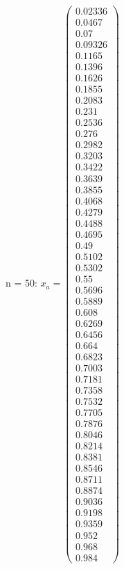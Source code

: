 \documentclass{udpreport}
\begin{document}
\begin{enumerate}
\begin{enumerate}
\begin{itemize}
\begin{itemize}
				n = 50: $x_{a} = \left(\begin{array}{c} 0.02336\\ 0.0467\\ 0.07\\ 0.09326\\ 0.1165\\ 0.1396\\ 0.1626\\ 0.1855\\ 0.2083\\ 0.231\\ 0.2536\\ 0.276\\ 0.2982\\ 0.3203\\ 0.3422\\ 0.3639\\ 0.3855\\ 0.4068\\ 0.4279\\ 0.4488\\ 0.4695\\ 0.49\\ 0.5102\\ 0.5302\\ 0.55\\ 0.5696\\ 0.5889\\ 0.608\\ 0.6269\\ 0.6456\\ 0.664\\ 0.6823\\ 0.7003\\ 0.7181\\ 0.7358\\ 0.7532\\ 0.7705\\ 0.7876\\ 0.8046\\ 0.8214\\ 0.8381\\ 0.8546\\ 0.8711\\ 0.8874\\ 0.9036\\ 0.9198\\ 0.9359\\ 0.952\\ 0.968\\ 0.984 \end{array}\right)$
				

\end{itemize}
\end{itemize}
\end{enumerate}
\end{enumerate}
\end{document}
